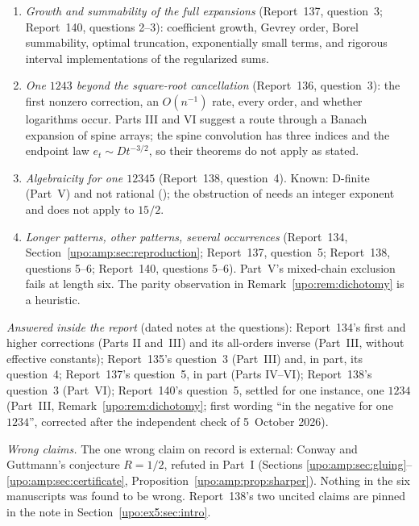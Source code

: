 \documentclass[11pt,letterpaper]{article}
\theoremstyle{remark}\newtheorem{remark}[theorem]{Remark}
\numberwithin{equation}{section}
\begin{document}
\begin{enumerate}[label=\arabic*.,ref=\arabic*]
\item \emph{Growth and summability of the full expansions} (Report~137, question~3; Report~140, questions 2--3): coefficient growth, Gevrey order, Borel summability, optimal truncation, exponentially small terms, and rigorous interval implementations of the regularized sums.
\item \emph{One $1243$ beyond the square-root cancellation} (Report~136, question~3): the first nonzero correction, an $O(n^{-1})$ rate, every order, and whether logarithms occur. Parts III and VI suggest a route through a Banach expansion of spine arrays; the spine convolution has three indices and the endpoint law $e_t\sim Dt^{-3/2}$, so their theorems do not apply as stated.
\item \emph{Algebraicity for one $12345$} (Report~138, question~4). Known: D-finite (Part~V) and not rational (\cite[Theorem 5.3]{BB}); the obstruction of \cite[Lemma 6.3]{BB} needs an integer exponent and does not apply to $15/2$.
\item \emph{Longer patterns, other patterns, several occurrences} (Report~134, Section~\ref{upo:amp:sec:reproduction}; Report~137, question~5; Report~138, questions 5--6; Report~140, questions 5--6). Part~V's mixed-chain exclusion fails at length six. The parity observation in Remark~\ref{upo:rem:dichotomy} is a heuristic.
\end{enumerate}
\emph{Answered inside the report} (dated notes at the questions): Report~134's first and higher corrections (Parts II and~III) and its all-orders inverse (Part~III, without effective constants); Report~135's question~3 (Part~III) and, in part, its question~4; Report~137's question~5, in part (Parts IV--VI); Report~138's question~3 (Part~VI); Report~140's question~5, settled for one instance, one $1234$ (Part~III, Remark~\ref{upo:rem:dichotomy}; first wording ``in the negative for one $1234$'', corrected after the independent check of 5~October 2026).

\emph{Wrong claims.} The one wrong claim on record is external: Conway and Guttmann's conjecture $R=1/2$, refuted in Part~I (Sections \ref{upo:amp:sec:gluing}--\ref{upo:amp:sec:certificate}, Proposition~\ref{upo:amp:prop:sharper}). Nothing in the six manuscripts was found to be wrong. Report~138's two uncited claims are pinned in the note in Section~\ref{upo:ex5:sec:intro}.
\end{document}
